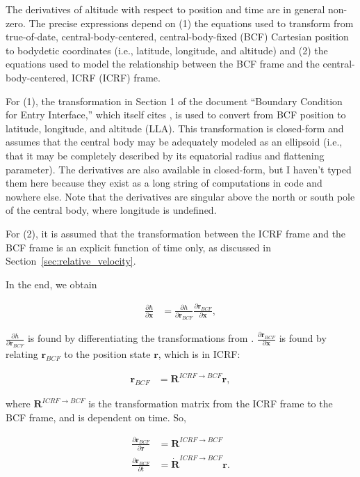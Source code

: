 \documentclass[]{article}
\newcommand{\vb}[1]{\bm{#1}} %
\newcommand{\vbd}[1]{\dot{\bm{#1}}} %
\newcommand{\pd}[2]{\frac{\partial #1}{\partial #2}} %
\begin{document}
\noindent The derivatives of altitude with respect to position and time are in general non-zero. The precise expressions depend on (1) the equations used to transform from true-of-date, central-body-centered, central-body-fixed (BCF) Cartesian position to bodydetic coordinates (i.e., latitude, longitude, and altitude) and (2) the equations used to model the relationship between the BCF frame and the central-body-centered, ICRF (ICRF) frame.

For (1), the transformation in Section 1 of the document ``Boundary Condition for Entry Interface,'' which itself cites \cite{matlab_geocentric_to_geodetic}, is used to convert from BCF position to latitude, longitude, and altitude (LLA). This transformation is closed-form and assumes that the central body may be adequately modeled as an ellipsoid (i.e., that it may be completely described by its equatorial radius and flattening parameter). The derivatives are also available in closed-form, but I haven't typed them here because they exist as a long string of computations in code and nowhere else. Note that the derivatives are singular above the north or south pole of the central body, where longitude is undefined.

For (2), it is assumed that the transformation between the ICRF frame and the BCF frame is an explicit function of time only, as discussed in Section~\ref{sec:relative_velocity}.

In the end, we obtain

\begin{align}
	\pd{h}{\vb{x}} &= \pd{h}{\vb{r}_{BCF}} \pd{\vb{r}_{BCF}}{\vb{x}},
\end{align}

\noindent $\pd{h}{\vb{r}_{BCF}}$ is found by differentiating the transformations from \cite{matlab_geocentric_to_geodetic}. $\pd{\vb{r}_{BCF}}{\vb{x}}$ is found by relating $\vb{r}_{BCF}$ to the position state $\vb{r}$, which is in ICRF:

\begin{align}
	\vb{r}_{BCF} &= \vb{R}^{ICRF \rightarrow BCF} \vb{r},
\end{align}

\noindent where $\vb{R}^{ICRF \rightarrow BCF}$ is the transformation matrix from the ICRF frame to the BCF frame, and is dependent on time. So,

\begin{align}
	\pd{\vb{r}_{BCF}}{\vb{r}} &= \vb{R}^{ICRF \rightarrow BCF} \\
	\pd{\vb{r}_{BCF}}{t} &= \vbd{R}^{ICRF \rightarrow BCF} \vb{r}.
\end{align}
\end{document}

